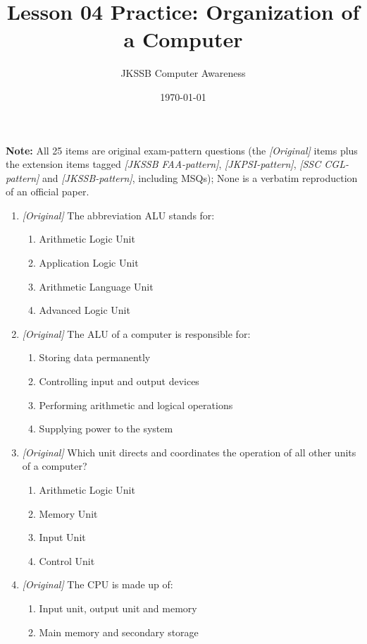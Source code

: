 \documentclass[11pt]{article}
\title{Lesson 04 Practice: Organization of a Computer}
\author{JKSSB Computer Awareness}
\date{\today}
\begin{document}
\maketitle
\noindent\textbf{Note:} All 25 items are original exam-pattern questions (the \textit{[Original]} items plus the extension items tagged \textit{[JKSSB FAA-pattern]}, \textit{[JKPSI-pattern]}, \textit{[SSC CGL-pattern]} and \textit{[JKSSB-pattern]}, including MSQs); None is a verbatim reproduction of an official paper.


\begin{enumerate}[label=\textbf{Q\arabic*.}, leftmargin=*]
\item \textit{[Original]} The abbreviation ALU stands for:
  \begin{enumerate}[label=\Alph*.]
    \item Arithmetic Logic Unit
    \item Application Logic Unit
    \item Arithmetic Language Unit
    \item Advanced Logic Unit
  \end{enumerate}
\item \textit{[Original]} The ALU of a computer is responsible for:
  \begin{enumerate}[label=\Alph*.]
    \item Storing data permanently
    \item Controlling input and output devices
    \item Performing arithmetic and logical operations
    \item Supplying power to the system
  \end{enumerate}
\item \textit{[Original]} Which unit directs and coordinates the operation of
  all other units of a computer?
  \begin{enumerate}[label=\Alph*.]
    \item Arithmetic Logic Unit
    \item Memory Unit
    \item Input Unit
    \item Control Unit
  \end{enumerate}
\item \textit{[Original]} The CPU is made up of:
  \begin{enumerate}[label=\Alph*.]
    \item Input unit, output unit and memory
    \item Main memory and secondary storage

\end{enumerate}
\end{enumerate}
\end{document}
